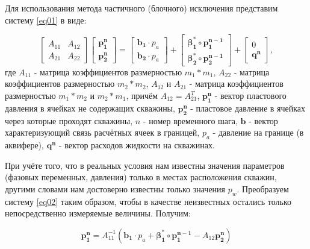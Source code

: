 \documentclass[14pt]{article}
\begin{document}
Для использования метода частичного (блочного) исключения представим систему \ref{eq01} в виде:

\begin{equation} \label{eq02}
	\begin{bmatrix}
		A_{11} & A_{12} \\
		A_{21} & A_{22}
	\end{bmatrix}
	\begin{bmatrix}
		 \mathbf { p_1^n } \\
		 \mathbf { p_2^n }
	\end{bmatrix}
	=
	\begin{bmatrix}
		 \mathbf {b_1} \cdot p_a \\
		 \mathbf {b_2} \cdot p_a 
	\end{bmatrix}
	+
	\begin{bmatrix}
		 \boldsymbol{\beta_1^*}\circ  \mathbf {p_1^{n-1}} \\
		  \boldsymbol{\beta_2^*}\circ  \mathbf {p_2^{n-1}} 
	\end{bmatrix}
	+
	\begin{bmatrix}
		0 \\
		\mathbf{q^n}
	\end{bmatrix},
\end{equation}
где $A_{11}$ - матрица коэффициентов размерностью $m_1*m_1$, $A_{22}$ - матрица коэффициентов  размерностью $m_2*m_2$, $A_{12}$ и $A_{21}$ - матрица коэффициентов размерностью $m_1*m_2$ и $m_2*m_1$, причём $A_{12}=A_{21}^T$, $\mathbf{p_1^n}$ - вектор пластового давления в ячейках не содержащих скважины, $\mathbf{p_2^n}$ - пластовое давление в ячейках через которые проходят скважины, $n$ - номер временного шага, $\mathbf{b}$ - вектор характеризующий связь расчётных ячеек в границей, $p_a$ - давление на границе (в аквифере), $\mathbf{q^n}$ - вектор расходов жидкости на скважинах. 

При учёте того, что в реальных условия нам известны значения параметров (фазовых переменных, давления) только в местах расположения скважин, другими словами нам достоверно известны только значения $p_w$. Преобразуем систему \ref{eq02} таким образом, чтобы в качестве неизвестных остались только непосредственно измеряемые величины. Получим:
 
\begin{equation} \label{eq03}
\mathbf { p_1^n } = A_{11}^{-1}\left(\mathbf{b_1} \cdot p_a +
\boldsymbol{\beta_1^*} \circ  \mathbf {p_1^{n-1}} - A_{12} \mathbf {p_2^n}  \right)
\end{equation}
\end{document}
